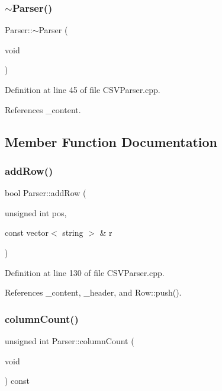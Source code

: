 \mbox{\label{class_parser_a1e70d9a903c5d2e8166fb571de3d581c}} 
\subsubsection{$\sim$Parser()}
{\footnotesize\ttfamily Parser\+::$\sim$\+Parser (\begin{DoxyParamCaption}\item[{void}]{ }\end{DoxyParamCaption})}



Definition at line 45 of file C\+S\+V\+Parser.\+cpp.



References \+\_\+content.



\subsection{Member Function Documentation}
\mbox{\label{class_parser_afe0f826abe9a149bbe798664cd9022ec}} 
\subsubsection{addRow()}
{\footnotesize\ttfamily bool Parser\+::add\+Row (\begin{DoxyParamCaption}\item[{unsigned int}]{pos,  }\item[{const vector$<$ string $>$ \&}]{r }\end{DoxyParamCaption})}



Definition at line 130 of file C\+S\+V\+Parser.\+cpp.



References \+\_\+content, \+\_\+header, and Row\+::push().

\mbox{\label{class_parser_a5f0dfff7f5168d2ca894319651f102e3}} 
\subsubsection{columnCount()}
{\footnotesize\ttfamily unsigned int Parser\+::column\+Count (\begin{DoxyParamCaption}\item[{void}]{ }\end{DoxyParamCaption}) const}



